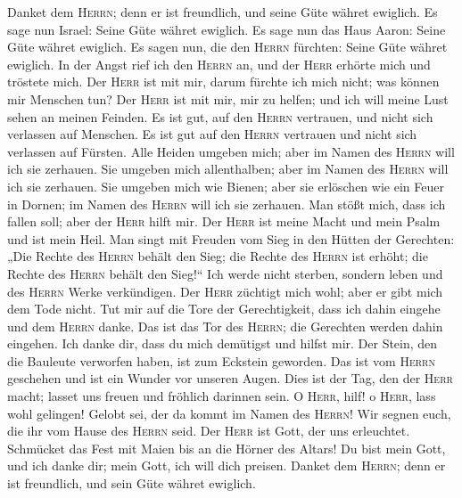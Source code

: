  Danket dem \textsc{Herrn}; denn er ist freundlich, und
seine Güte währet ewiglich.  Es sage nun Israel: Seine
Güte währet ewiglich.  Es sage nun das Haus Aaron: Seine
Güte währet ewiglich.  Es sagen nun, die den
\textsc{Herrn} fürchten: Seine Güte währet ewiglich.  In
der Angst rief ich den \textsc{Herrn} an, und der \textsc{Herr} erhörte
mich und tröstete mich.  Der \textsc{Herr} ist mit mir,
darum fürchte ich mich nicht; was können mir Menschen tun?
 Der \textsc{Herr} ist mit mir, mir zu helfen; und ich
will meine Lust sehen an meinen Feinden.  Es ist gut, auf
den \textsc{Herrn} vertrauen, und nicht sich verlassen auf Menschen.
 Es ist gut auf den \textsc{Herrn} vertrauen und nicht
sich verlassen auf Fürsten.  Alle Heiden umgeben mich;
aber im Namen des \textsc{Herrn} will ich sie zerhauen. 
Sie umgeben mich allenthalben; aber im Namen des \textsc{Herrn} will ich
sie zerhauen.  Sie umgeben mich wie Bienen; aber sie
erlöschen wie ein Feuer in Dornen; im Namen des \textsc{Herrn} will ich
sie zerhauen.  Man stößt mich, dass ich fallen soll; aber
der \textsc{Herr} hilft mir.  Der \textsc{Herr} ist meine
Macht und mein Psalm und ist mein Heil.  Man singt mit
Freuden vom Sieg in den Hütten der Gerechten: „Die Rechte des
\textsc{Herrn} behält den Sieg;  die Rechte des
\textsc{Herrn} ist erhöht; die Rechte des \textsc{Herrn} behält den
Sieg!{}``  Ich werde nicht sterben, sondern leben und des
\textsc{Herrn} Werke verkündigen.  Der \textsc{Herr}
züchtigt mich wohl; aber er gibt mich dem Tode nicht. 
Tut mir auf die Tore der Gerechtigkeit, dass ich dahin eingehe und dem
\textsc{Herrn} danke.  Das ist das Tor des
\textsc{Herrn}; die Gerechten werden dahin eingehen.  Ich
danke dir, dass du mich demütigst und hilfst mir.  Der
Stein, den die Bauleute verworfen haben, ist zum Eckstein geworden.
 Das ist vom \textsc{Herrn} geschehen und ist ein Wunder
vor unseren Augen.  Dies ist der Tag, den der
\textsc{Herr} macht; lasset uns freuen und fröhlich darinnen sein.
 O \textsc{Herr}, hilf! o \textsc{Herr}, lass wohl
gelingen!  Gelobt sei, der da kommt im Namen des
\textsc{Herrn}! Wir segnen euch, die ihr vom Hause des \textsc{Herrn}
seid.  Der \textsc{Herr} ist Gott, der uns erleuchtet.
Schmücket das Fest mit Maien bis an die Hörner des Altars!
 Du bist mein Gott, und ich danke dir; mein Gott, ich
will dich preisen.  Danket dem \textsc{Herrn}; denn er
ist freundlich, und sein Güte währet ewiglich.

